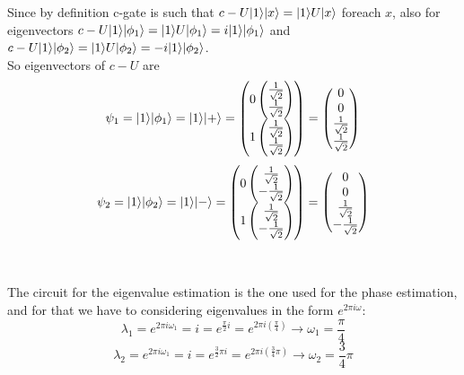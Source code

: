 \documentclass{article}
\DeclarePairedDelimiter\ket{\lvert}{\rangle}
\begin{document}
Since by definition c-gate is such that $c-U\ket{1}\ket{x} = \ket{1}U\ket{x} $ foreach $x$, also for eigenvectors  $c-U\ket{1}\ket{\phi_1} = \ket{1}U\ket{\phi_1} = i\ket{1}\ket{\phi_1}$ and $c-U\ket{1}\ket{\phi_2} = \ket{1}U\ket{\phi_2} = -i\ket{1}\ket{\phi_2}$. \\
So eigenvectors of $c-U$ are
\[\psi_1 = \ket{1}\ket{\phi_1} = \ket{1}\ket{+} =  \begin{pmatrix} 0 \begin{pmatrix}  \frac{1}{\sqrt{2}} \\  \frac{1}{\sqrt{2}} \end{pmatrix} \\ 1 \begin{pmatrix}  \frac{1}{\sqrt{2}} \\  \frac{1}{\sqrt{2}} \end{pmatrix} \end{pmatrix} = \begin{pmatrix} 0 \\ 0 \\  \frac{1}{\sqrt{2}} \\  \frac{1}{\sqrt{2}} \end{pmatrix} \]
\[\psi_2 = \ket{1}\ket{\phi_2} = \ket{1}\ket{-} = \begin{pmatrix} 0 \begin{pmatrix}  \frac{1}{\sqrt{2}} \\  -\frac{1}{\sqrt{2}} \end{pmatrix} \\ 1 \begin{pmatrix}  \frac{1}{\sqrt{2}} \\  -\frac{1}{\sqrt{2}} \end{pmatrix} \end{pmatrix} = \begin{pmatrix} 0 \\ 0 \\  \frac{1}{\sqrt{2}} \\ -\frac{1}{\sqrt{2}} \end{pmatrix} \]
\\
\\
The circuit for the eigenvalue estimation is the one used for the phase estimation, and for that we have to considering eigenvalues in the form $e^{2\pi i \omega}$:
\[\lambda_1 = e^{2\pi i \omega_1} = i = e^{\frac{\pi}{2} i} = e^{2\pi i (\frac{\pi}{4})} \rightarrow \omega_1 = \frac{\pi}{4}\]
\[\lambda_2 = e^{2\pi i \omega_1} = i = e^{\frac{3}{2}\pi i} = e^{2\pi i (\frac{3}{4}\pi)} \rightarrow \omega_2 = \frac{3}{4}\pi\]
\end{document}

